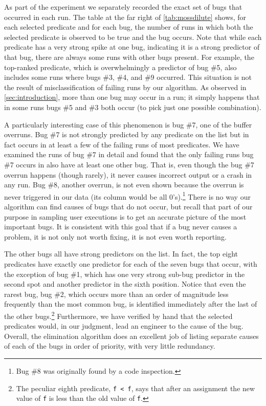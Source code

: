 As part of the experiment we separately recorded the exact set of
bugs that occurred in each run.
The table at the far right of \autoref{tab:mossdilute} shows, for
each selected predicate and for each bug, the number of runs in which
both the selected predicate is observed to be true and the bug occurs.
Note that while each
predicate has a very strong spike at one bug, indicating it is a
strong predictor of that bug, there are always some runs with other
bugs present.  For example, the top-ranked predicate, which is
overwhelmingly a predictor of bug \#5, also includes some runs where
bugs \#3, \#4, and \#9 occurred.  This situation is not the result of
misclassification of failing runs by our algorithm.  As observed in
\autoref{sec:introduction}, more than one bug may occur in a run;
it simply happens that in some runs bugs \#5 and \#3 both occur (to
pick just one possible combination).

A particularly interesting case of this phenomenon is bug \#7, one of
the buffer overruns.  Bug \#7 is not strongly predicted by any
predicate on the list but in fact occurs in at least a few of the
failing runs of most predicates.  We have examined the runs of bug \#7
in detail and found that the only failing runs bug \#7 occurs in also
have at least one other bug.  That is, even though the bug \#7 overrun
happens (though rarely), it never causes incorrect output or a crash
in any run.  Bug \#8, another overrun, is not even shown because the
overrun is never triggered in our data (its column would be all
0's).\footnote{Bug \#8 was originally found by a code inspection.}
There is no way our algorithm can find causes of bugs that do not
occur, but recall that part of our purpose in sampling user executions
is to get an accurate picture of the most important bugs. It is
consistent with this goal that if a bug never causes a problem, it is
not only not worth fixing, it is not even worth reporting.

The other bugs all have strong predictors on the list.  In fact,
the top eight predicates have exactly one predictor for each of the seven
bugs that occur, with the exception of bug \#1, which has one very
strong sub-bug predictor in the second spot and another predictor
in the sixth position.  Notice that even the rarest bug, bug \#2,
which occurs more than an order of magnitude less frequently than
the most common bug, is identified immediately after the last of
the other bugs.\footnote{The peculiar eighth predicate, \texttt{f < f},
says that after an assignment the new value of {\tt f} is less than
the old value of {\tt f}.}  Furthermore, we have verified by hand that
the selected predicates would, in our judgment, lead an engineer to
the cause of the bug. Overall, the elimination algorithm does an excellent
job of listing separate causes of each of the bugs in order of priority,
with very little redundancy.

